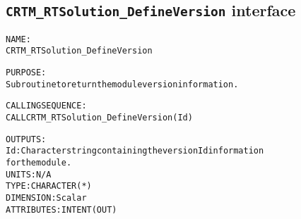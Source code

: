 \subsection{\texttt{CRTM\_RTSolution\_DefineVersion} interface}
  \label{sec:CRTM_RTSolution_DefineVersion_interface}
  \begin{alltt}
 
  NAME:
        CRTM_RTSolution_DefineVersion
 
  PURPOSE:
        Subroutine to return the module version information.
 
  CALLING SEQUENCE:
        CALL CRTM_RTSolution_DefineVersion( Id )
 
  OUTPUTS:
        Id:            Character string containing the version Id information
                       for the module.
                       UNITS:      N/A
                       TYPE:       CHARACTER(*)
                       DIMENSION:  Scalar
                       ATTRIBUTES: INTENT(OUT)
 
  \end{alltt}

